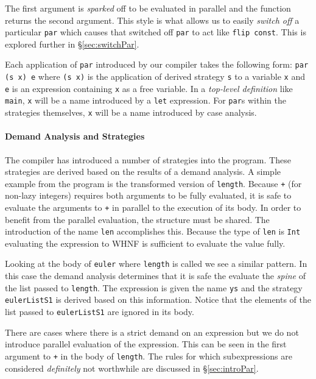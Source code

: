 The first argument is \emph{sparked} off to be evaluated in parallel and the
function returns the second argument. This style is what allows us to easily
\emph{switch off} a particular \verb-par- which causes that switched off
\verb-par- to act like \verb-flip const-. This is explored further in
\S\ref{sec:switchPar}.

Each application of \verb-par- introduced by our compiler takes the following
form: \verb-par (s x) e- where \verb-(s x)- is the application of derived
strategy \verb-s- to a variable \verb$x$ and \verb$e$ is an expression containing \verb$x$ as a
free variable.  In a \emph{top-level definition} like \verb-main-, \verb$x$ will be a
name introduced by a \verb-let- expression. For \verb-par-s within the
strategies themselves, \verb$x$ will be a name introduced by case analysis.

\paragraph{Demand Analysis and Strategies}

The compiler has introduced a number of strategies into the program. These
strategies are derived based on the results of a demand analysis. A simple
example from the program is the transformed version of \verb-length-. Because
\verb-+- (for non-lazy integers) requires both arguments to be fully evaluated, it is safe to 
evaluate the arguments to \verb-+- in parallel to the execution of its body.
In order to benefit from the parallel evaluation, the structure must be shared.
The introduction of the name \verb-len- accomplishes this. Because the type
of \verb-len- is \verb-Int- evaluating the expression to WHNF is sufficient to
evaluate the value fully. 

Looking at the body of \verb-euler- where \verb-length- is called we see a
similar pattern. In this case the demand analysis determines that it is
safe the evaluate the \emph{spine} of the list passed to \verb-length-.
The expression is given the name \verb-ys- and the strategy \verb-eulerListS1-
is derived based on this information. Notice that the elements of the list
passed to \verb-eulerListS1- are ignored in its body. 

There are cases where there is a strict demand on an expression but we
do not introduce parallel evaluation of the expression. This can be seen
in the first argument to \verb-+- in the body of \verb-length-. The rules
for which subexpressions are considered \emph{definitely} not worthwhile
are discussed in \S\ref{sec:introPar}.

